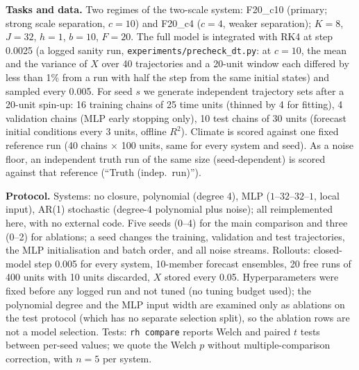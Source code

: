 \textbf{Tasks and data.} Two regimes of the two-scale system: F20\_c10 (primary; strong scale separation, $c{=}10$) and F20\_c4 ($c{=}4$, weaker separation); $K{=}8$, $J{=}32$, $h{=}1$, $b{=}10$, $F{=}20$. The full model is integrated with RK4 at step 0.0025 (a logged sanity run, \texttt{experiments/precheck\_dt.py}: at $c{=}10$, the mean and the variance of $X$ over 40 trajectories and a 20-unit window each differed by less than 1\% from a run with half the step from the same initial states) and sampled every 0.005. For seed $s$ we generate independent trajectory sets after a 20-unit spin-up: 16 training chains of 25 time units (thinned by 4 for fitting), 4 validation chains (MLP early stopping only), 10 test chains of 30 units (forecast initial conditions every 3 units, offline $R^2$). Climate is scored against one fixed reference run (40 chains $\times$ 100 units, same for every system and seed). As a noise floor, an independent truth run of the same size (seed-dependent) is scored against that reference (``Truth (indep.\ run)'').

\textbf{Protocol.} Systems: no closure, polynomial (degree 4), MLP ($1$--$32$--$32$--$1$, local input), AR(1) stochastic (degree-4 polynomial plus noise); all reimplemented here, with no external code. Five seeds (0--4) for the main comparison and three (0--2) for ablations; a seed changes the training, validation and test trajectories, the MLP initialisation and batch order, and all noise streams. Rollouts: closed-model step 0.005 for every system, 10-member forecast ensembles, 20 free runs of 400 units with 10 units discarded, $X$ stored every 0.05. Hyperparameters were fixed before any logged run and not tuned (no tuning budget used); the polynomial degree and the MLP input width are examined only as ablations on the test protocol (which has no separate selection split), so the ablation rows are not a model selection. Tests: \texttt{rh compare} reports Welch and paired $t$ tests between per-seed values; we quote the Welch $p$ without multiple-comparison correction, with $n{=}5$ per system.

